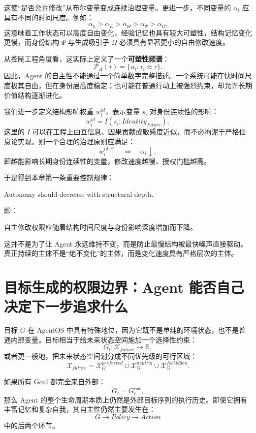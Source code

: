这使“是否允许修改”从布尔变量变成连续治理变量。更进一步，不同变量的 $\alpha_i$ 应具有不同的时间尺度。例如：
\[
\alpha_h
>
\alpha_E
>
\alpha_\Theta
>
\alpha_\Psi
>
\alpha_\Omega.
\]
这意味着工作状态可以高度自由变化，经验记忆也具有较大可塑性，结构记忆变化更慢，而身份结构 $\Psi$ 与生成吸引子 $\Omega$ 必须具有显著更小的自由修改速度。

从控制工程角度看，这实际上定义了一个\textbf{可塑性频谱}：
\[
\boxed{
\mathcal P_A(\tau)
=
\{
\alpha_i:
\tau_i\approx\tau
\}.
}
\]
因此，Agent 的自主性不能通过一个简单数字完整描述。一个系统可能在快时间尺度极其自由，但在身份层高度稳定；也可能在普通行动上被强烈约束，却允许长期价值结构逐渐进化。

我们进一步定义结构影响权重 $w_i^{id}$，表示变量 $s_i$ 对身份连续性的影响：
\[
w_i^{id}
=
I(s_i;Identity_{future}),
\]
这里的 $I$ 可以在工程上由互信息、因果贡献或敏感度近似，而不必拘泥于严格信息论实现。则一个合理的治理原则应满足：
\[
w_i^{id}\uparrow
\quad\Rightarrow\quad
\alpha_i\downarrow,
\]
即越能影响长期身份连续性的变量，修改速度越慢、授权门槛越高。

于是得到本章第一条重要控制规律：
\begin{proposition*}
Autonomy should decrease with structural depth.
\end{proposition*}
即：
\begin{statementbox}
自主修改权限应随着结构时间尺度与身份影响深度增加而下降。
\end{statementbox}

这并不是为了让 Agent 永远维持不变，而是防止最慢结构被最快噪声直接驱动。真正持续的主体不是“绝不变化”的主体，而是变化速度具有严格层次的主体。

\section{目标生成的权限边界：Agent 能否自己决定下一步追求什么}

目标 $G$ 在 AgentOS 中具有特殊地位，因为它既不是单纯的环境状态，也不是普通内部变量。目标相当于给未来状态空间施加一个选择性约束：
\[
G_t:
\mathcal X_{future}
\rightarrow
\mathbb R,
\]
或者更一般地，把未来状态空间划分成不同优先级的可行区域：
\[
\mathcal X_{future}
=
\mathcal X_G^{preferred}
\cup
\mathcal X_G^{neutral}
\cup
\mathcal X_G^{forbidden}.
\]

如果所有 Goal 都完全来自外部：
\[
G_t
=
G_t^{ext},
\]
那么 Agent 的整个生命周期本质上仍然是外部目标序列的执行历史。即使它拥有丰富记忆和复杂自我，其自主性仍然主要发生在：
\[
G\rightarrow Policy\rightarrow Action
\]
中的后两个环节。

